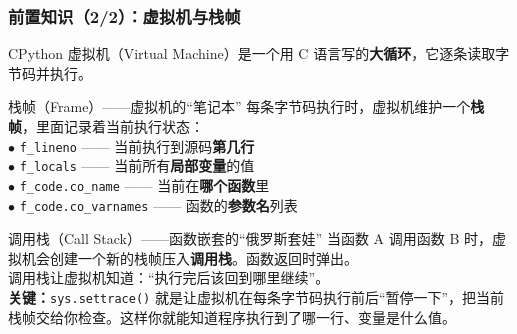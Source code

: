 \documentclass[presentation,aspectratio=169]{ctexbeamer}
\begin{document}
\begin{frame}
\frametitle{前置知识（2/2）：虚拟机与栈帧}
{\footnotesize CPython 虚拟机（Virtual Machine）是一个用 C 语言写的\textbf{大循环}，它逐条读取字节码并执行。}

\vspace{0.1cm}
\begin{block}{\footnotesize 栈帧（Frame）——虚拟机的``笔记本''}
{\footnotesize 每条字节码执行时，虚拟机维护一个\textbf{栈帧}，里面记录着当前执行状态：\\[3pt]
\quad $\bullet$ \texttt{f\_lineno} —— 当前执行到源码\textbf{第几行}\\
\quad $\bullet$ \texttt{f\_locals} —— 当前所有\textbf{局部变量}的值\\
\quad $\bullet$ \texttt{f\_code.co\_name} —— 当前在\textbf{哪个函数}里\\
\quad $\bullet$ \texttt{f\_code.co\_varnames} —— 函数的\textbf{参数名}列表}
\end{block}

\vspace{0.1cm}
\begin{block}{\footnotesize 调用栈（Call Stack）——函数嵌套的``俄罗斯套娃''}
{\footnotesize 当函数 A 调用函数 B 时，虚拟机会创建一个新的栈帧压入\textbf{调用栈}。函数返回时弹出。\\[3pt]
调用栈让虚拟机知道：``执行完后该回到哪里继续''。\\[3pt]
\textbf{关键：}\texttt{sys.settrace()} 就是让虚拟机在每条字节码执行前后``暂停一下''，把当前栈帧交给你检查。这样你就能知道程序执行到了哪一行、变量是什么值。}
\end{block}
\end{frame}

\end{document}
